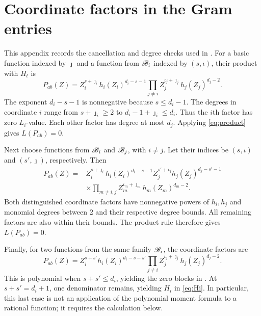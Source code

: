 \section{Coordinate factors in the Gram entries}\label{app:entries}

This appendix records the cancellation and degree checks used in
. For a basic function indexed by $\jmath$ and a
function from $\mathscr B_i$ indexed by $(s,\iota)$, their product with
$H_t$ is
\begin{equation}\label{eq:cross-basic}
P_{ab}(Z)=
Z_i^{s+\jmath_i}h_i(Z_i)^{d_i-s-1}
\prod_{j\ne i}Z_j^{\iota_j+\jmath_j}h_j(Z_j)^{d_j-2}.
\end{equation}
The exponent $d_i-s-1$ is nonnegative because $s\le d_i-1$.
The degrees in coordinate $i$ range from $s+\jmath_i\ge2$ to
$d_i-1+\jmath_i\le d_i$. Thus the $i$th factor has zero
$L_i$-value. Each other factor has degree at most $d_j$.
Applying \eqref{eq:product} gives $L(P_{ab})=0$.

Next choose functions from $\mathscr B_i$ and $\mathscr B_j$, with $i\ne j$.
Let their indices be $(s,\iota)$ and $(s',\jmath)$, respectively.
Then
\begin{equation}\label{eq:cross-additional}
\begin{split}
P_{ab}(Z)={}&
Z_i^{s+\jmath_i}h_i(Z_i)^{d_i-s-1}
Z_j^{s'+\iota_j}h_j(Z_j)^{d_j-s'-1}\\
&\times\prod_{m\ne i,j}
Z_m^{\iota_m+\jmath_m}h_m(Z_m)^{d_m-2}.
\end{split}
\end{equation}
Both distinguished coordinate factors have nonnegative powers of
$h_i,h_j$ and monomial degrees between $2$ and their respective
degree bounds. All remaining factors are also within their bounds.
The product rule therefore gives $L(P_{ab})=0$.

Finally, for two functions from the same family $\mathscr B_i$,
the coordinate factors are
\begin{equation}\label{eq:same-family}
P_{ab}(Z)=Z_i^{s+s'}h_i(Z_i)^{d_i-s-s'}
\prod_{j\ne i}Z_j^{\iota_j+\jmath_j}h_j(Z_j)^{d_j-2}.
\end{equation}
This is polynomial when $s+s'\le d_i$, yielding the zero blocks
in . At $s+s'=d_i+1$, one denominator remains,
yielding $H_i$ in \eqref{eq:Hi}. In particular, this last case
is not an application of the polynomial moment formula to a
rational function; it requires the calculation below.
